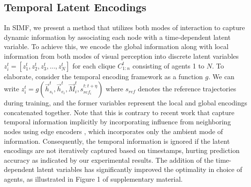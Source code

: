 \documentclass{article}
\begin{document}
\subsection{Temporal Latent Encodings}
In SIMF, we present a method that utilizes both modes of interaction to capture dynamic information by associating each node with a time-dependent latent variable. To achieve this, we encode the %
global information along with local information from both modes of visual perception into discrete latent variables $z^t_i = [z^t_1, z^t_2, z^t_3, ..., z^t_N]$ for each clique $C^t_{1:n}$ consisting of agents 1 to $N$. To elaborate, consider the temporal encoding  framework as a function $g$. We can write $z_i^{t} = g(\vec h_{s_i}^{t},\vec h_{e_i}^{t}, \vec M_i^t,  s_{{ref}_i}^{t:t+\eta})$ where $s_{ref}$ denotes the reference trajectories during training, and the former variables represent the local and global encodings concatenated together. Note that this is contrary to recent work that capture temporal information implicitly by incorporating influence from neighboring nodes using edge encoders \citep{salzmann2021trajectron}, which incorporates only the ambient mode of information. %
Consequently, the temporal information is ignored if the latent encodings are not iteratively captured based on timestamps, hurting prediction accuracy as indicated by our experimental results. The addition of the time-dependent latent variables has significantly improved the optimality in choice of agents, as illustrated in Figure 1 of supplementary material. %
\end{document}
